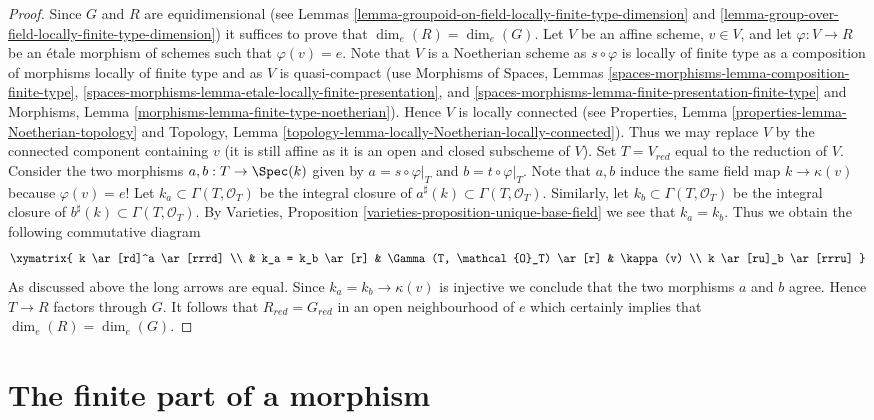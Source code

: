 \begin{proof}
Since $G$ and $R$ are equidimensional (see
Lemmas \ref{lemma-groupoid-on-field-locally-finite-type-dimension} and
\ref{lemma-group-over-field-locally-finite-type-dimension})
it suffices to prove that $\dim_e(R) = \dim_e(G)$. Let $V$ be an affine scheme,
$v \in V$, and let $\varphi : V \to R$ be an \'etale morphism of schemes
such that $\varphi(v) = e$. Note that $V$ is a Noetherian scheme as
$s \circ \varphi$ is locally of finite type as a composition of morphisms
locally of finite type and as $V$ is quasi-compact (use
Morphisms of Spaces, Lemmas
\ref{spaces-morphisms-lemma-composition-finite-type},
\ref{spaces-morphisms-lemma-etale-locally-finite-presentation}, and
\ref{spaces-morphisms-lemma-finite-presentation-finite-type}
and
Morphisms, Lemma \ref{morphisms-lemma-finite-type-noetherian}).
Hence $V$ is locally connected (see
Properties, Lemma \ref{properties-lemma-Noetherian-topology}
and
Topology, Lemma \ref{topology-lemma-locally-Noetherian-locally-connected}).
Thus we may replace $V$ by the connected component containing $v$ (it
is still affine as it is an open and closed subscheme of $V$).
Set $T = V_{red}$ equal to the reduction of $V$. Consider the two
morphisms $a, b : T \to \Spec(k)$ given by
$a = s \circ \varphi|_T$ and $b = t \circ \varphi|_T$. Note that
$a, b$ induce the same field map $k \to \kappa(v)$ because $\varphi(v) = e$!
Let $k_a \subset \Gamma(T, \mathcal{O}_T)$ be the integral closure of
$a^\sharp(k) \subset \Gamma(T, \mathcal{O}_T)$. Similarly, let
$k_b \subset \Gamma(T, \mathcal{O}_T)$ be the integral closure of
$b^\sharp(k) \subset \Gamma(T, \mathcal{O}_T)$. By
Varieties, Proposition \ref{varieties-proposition-unique-base-field}
we see that $k_a = k_b$. Thus we obtain the following commutative diagram
$$
\xymatrix{
k \ar[rd]^a \ar[rrrd] \\
& k_a = k_b \ar[r] & \Gamma(T, \mathcal{O}_T) \ar[r] & \kappa(v) \\
k \ar[ru]_b \ar[rrru]
}
$$
As discussed above the long arrows are equal.
Since $k_a = k_b \to \kappa(v)$ is injective we conclude that
the two morphisms $a$ and $b$ agree. Hence $T \to R$ factors through $G$.
It follows that $R_{red} = G_{red}$ in an open neighbourhood of $e$
which certainly implies that $\dim_e(R) = \dim_e(G)$.
\end{proof}






\section{The finite part of a morphism}
\label{section-finite}

